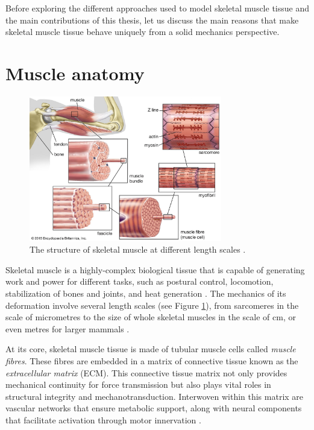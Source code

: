 \documentclass{sfuthesis}
\numberwithin{equation}{section}
\numberwithin{figure}{chapter}
\numberwithin{table}{chapter}
\theoremstyle{definition}
\begin{document}
Before exploring the different approaches used to model skeletal muscle tissue and the main contributions of this thesis, let us discuss the main reasons that make skeletal muscle tissue behave uniquely from a solid mechanics perspective.

\section{Muscle anatomy}

\begin{figure}
    \centering
    \includegraphics[width=0.75\textwidth]{figs/muscle-anatomy.jpg}
    \caption{The structure of skeletal muscle at different length scales \cite{MusclePicture}.}
    \label{fig:muscle_anatomy}
\end{figure}

Skeletal muscle is a highly-complex biological tissue that is capable of generating work and power for different tasks, such as postural control, locomotion, stabilization of bones and joints, and heat generation \cite{HillFirstLast1970,Lieber2010Book}.
The mechanics of its deformation involve several length scales (see Figure \ref{fig:muscle_anatomy}), from sarcomeres in the scale of micrometres to the size of whole skeletal muscles in the scale of cm, or even metres for larger mammals \cite{Lieber2010Book}.

At its core, skeletal muscle tissue is made of tubular muscle cells called \textit{muscle fibres}. These fibres are embedded in a matrix of connective tissue known as the \textit{extracellular matrix} (ECM). 
This connective tissue matrix not only provides mechanical continuity for force transmission but also plays vital roles in structural integrity and mechanotransduction. Interwoven within this matrix are vascular networks that ensure metabolic support, along with neural components that facilitate activation through motor innervation \cite{GilliesLieber2011ECM,Lieber2010Book, Mahdy2019}. 
\end{document}
